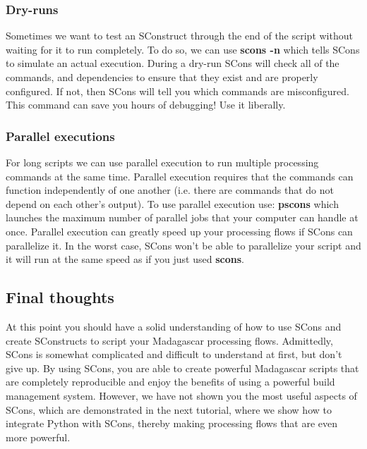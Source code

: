 \subsubsection{Dry-runs}

Sometimes we want to test an SConstruct through the end of the script without waiting for it to run completely.  To do so, we can use \textbf{scons -n} which tells SCons to simulate an actual execution. During a dry-run SCons will check all of the commands, and dependencies to ensure that they exist and are properly configured.  If not, then SCons will tell you which commands are misconfigured.  This command can save you hours of debugging!  Use it liberally.

\subsubsection{Parallel executions}

For long scripts we can use parallel execution to run multiple processing commands at the same time.  Parallel execution requires that the commands can function independently of one another (i.e. there are commands that do not depend on each other's output).  To use parallel execution use: \textbf{pscons} which launches the maximum number of parallel jobs that your computer can handle at once.  Parallel execution can greatly speed up your processing flows if SCons can parallelize it.  In the worst case, SCons won't be able to parallelize your script and it will run at the same speed as if you just used \textbf{scons}.

\subsection{Final thoughts}

At this point you should have a solid understanding of how to use SCons and create SConstructs to script your Madagascar processing flows.  Admittedly, SCons is somewhat complicated and difficult to understand at first, but don't give up.  By using SCons, you are able to create powerful Madagascar scripts that are completely reproducible and enjoy the benefits of using a powerful build management system.  However, we have not shown you the most useful aspects of SCons, which are demonstrated in the next tutorial, where we show how to integrate Python with SCons, thereby making processing flows that are even more powerful.
 
